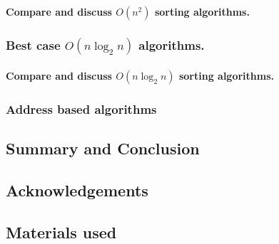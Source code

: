 \documentclass{acm_proc_article-sp}
\begin{document}
\paragraph{Compare and discuss $O(n^2)$ sorting algorithms. }
\subsubsection{Best case $O(n \log_2 n)$ algorithms.}
\paragraph{Compare and discuss $O(n \log_2 n)$ sorting algorithms. }
\subsubsection{Address based algorithms}
\subsection{Summary and Conclusion}
\subsection{Acknowledgements}
\subsection{Materials used}
\end{document}
